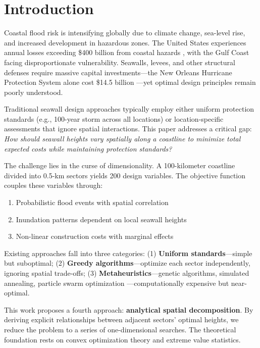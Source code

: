 \documentclass[3p,twocolumn]{elsarticle}
\begin{document}
\section{Introduction}

Coastal flood risk is intensifying globally due to climate change, sea-level rise, and increased development in hazardous zones. The United States experiences annual losses exceeding \$400 billion from coastal hazards \cite{hallegatte2013future}, with the Gulf Coast facing disproportionate vulnerability. Seawalls, levees, and other structural defenses require massive capital investments---the New Orleans Hurricane Protection System alone cost \$14.5 billion \cite{yoe2018costbenefit}---yet optimal design principles remain poorly understood.

Traditional seawall design approaches typically employ either uniform protection standards (e.g., 100-year storm across all locations) or location-specific assessments that ignore spatial interactions. This paper addresses a critical gap: \textit{How should seawall heights vary spatially along a coastline to minimize total expected costs while maintaining protection standards?}

The challenge lies in the curse of dimensionality. A 100-kilometer coastline divided into 0.5-km sectors yields 200 design variables. The objective function couples these variables through:
\begin{enumerate}
  \item Probabilistic flood events with spatial correlation
  \item Inundation patterns dependent on local seawall heights
  \item Non-linear construction costs with marginal effects
\end{enumerate}

Existing approaches fall into three categories: (1) \textbf{Uniform standards}---simple but suboptimal; (2) \textbf{Greedy algorithms}---optimize each sector independently, ignoring spatial trade-offs; (3) \textbf{Metaheuristics}---genetic algorithms, simulated annealing, particle swarm optimization \cite{yadav2021optimization}---computationally expensive but near-optimal.

This work proposes a fourth approach: \textbf{analytical spatial decomposition}. By deriving explicit relationships between adjacent sectors' optimal heights, we reduce the problem to a series of one-dimensional searches. The theoretical foundation rests on convex optimization theory and extreme value statistics.
\end{document}
